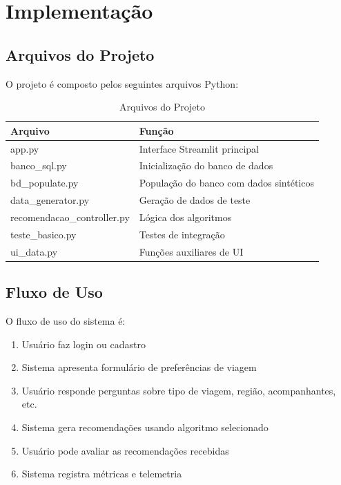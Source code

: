 \documentclass[10pt,twocolumn,letterpaper]{article}
\begin{document}
\section{Implementação}

\subsection{Arquivos do Projeto}

O projeto é composto pelos seguintes arquivos Python:

\begin{table}[h]
\centering
\small
\caption{Arquivos do Projeto}
\label{tab:files}
\begin{tabularx}{\columnwidth}{@{}lX@{}}
\toprule
\textbf{Arquivo} & \textbf{Função} \\
\midrule
app.py & Interface Streamlit principal \\
banco\_sql.py & Inicialização do banco de dados \\
bd\_populate.py & População do banco com dados sintéticos \\
data\_generator.py & Geração de dados de teste \\
recomendacao\_controller.py & Lógica dos algoritmos \\
teste\_basico.py & Testes de integração \\
ui\_data.py & Funções auxiliares de UI \\
\bottomrule
\end{tabularx}
\end{table}

\subsection{Fluxo de Uso}

O fluxo de uso do sistema é:

\begin{enumerate}
    \item Usuário faz login ou cadastro
    \item Sistema apresenta formulário de preferências de viagem
    \item Usuário responde perguntas sobre tipo de viagem, região, acompanhantes, etc.
    \item Sistema gera recomendações usando algoritmo selecionado
    \item Usuário pode avaliar as recomendações recebidas
    \item Sistema registra métricas e telemetria
\end{enumerate}
\end{document}
